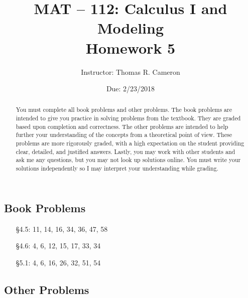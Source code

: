 \documentclass{article}
\title{MAT -- 112: Calculus I and Modeling\\
\large{Homework 5}}
\author{Instructor: Thomas R. Cameron}
\date{Due: 2/23/2018}
\begin{document}
\maketitle

\begin{abstract}
You must complete all book problems and other problems. The book problems are intended to give you practice in solving problems from the textbook. They are graded based upon completion and correctness. The other problems are intended to help further your understanding of the concepts from a theoretical point of view. These problems are more rigorously graded, with a high expectation on the student providing clear, detailed, and justified answers. Lastly, you may work with other students and ask me any questions, but you may not look up solutions online. You must write your solutions independently so I may interpret your understanding while grading. 
\end{abstract}

\subsection*{Book Problems}
\begin{itemize}
\item   [\S 4.5:] 11, 14, 16, 34, 36, 47, 58
\item   [\S 4.6:] 4, 6, 12, 15, 17, 33, 34
\item   [\S 5.1:] 4, 6, 16, 26, 32, 51, 54
\end{itemize}

\subsection*{Other Problems}
\end{document}
